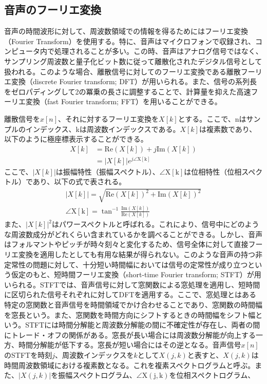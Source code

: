 \documentclass[12pt]{jarticle}
\numberwithin{equation}{section}    %
\numberwithin{figure}{section}      %
\numberwithin{table}{section}      %
\begin{document}
\subsection{音声のフーリエ変換}
音声の時間波形に対して、周波数領域での情報を得るためにはフーリエ変換（Fourier Transform）を使用する。特に、音声はマイクロフォンで収録され、コンピュータ内で処理されることが多い。この時、音声はアナログ信号ではなく、サンプリング周波数と量子化ビット数に従って離散化されたデジタル信号として扱われる。このような場合、離散信号に対してのフーリエ変換である離散フーリエ変換（discrete Fourier transform; DFT）が用いられる。また、信号の系列長をゼロパディングして2の冪乗の長さに調整することで、計算量を抑えた高速フーリエ変換（fast Fourier transform; FFT）を用いることができる。

離散信号を$x[n]$、それに対するフーリエ変換を$X[k]$とする。ここで、nはサンプルのインデックス、kは周波数インデックスである。$X[k]$は複素数であり、以下のように極座標表示することができる。
\begin{align}
    X[k] & = \mathrm{Re}(X[k]) + j\mathrm{Im}(X[k]) \\
         & = |X[k]|e^{j\angle\mathrm{X[k]}}
\end{align}
ここで、$|X[k]|$は振幅特性（振幅スペクトル）、$\angle\mathrm{X[k]}$は位相特性（位相スペクトル）であり、以下の式で表される。
\begin{gather}
    |X[k]| = \sqrt{\mathrm{Re}(X[k])^{2} + \mathrm{Im}(X[k])^{2}} \\
    \angle\mathrm{X[k]} = \tan^{-1} \frac{\mathrm{Im}(X[k])}{\mathrm{Re}(X[k])}
\end{gather}
また、$|X[k]|^2$はパワースペクトルと呼ばれる。これにより、信号中にどのような周波数成分がどれくらい含まれているかを調べることができる。しかし、音声はフォルマントやピッチが時々刻々と変化するため、信号全体に対して直接フーリエ変換を適用したとしても有用な結果が得られない。このような音声の持つ非定常性の問題に対して、十分短い時間幅においては信号の定常性が成り立つという仮定のもと、短時間フーリエ変換（short-time Fourier transform; STFT）が用いられる。STFTでは、音声信号に対して窓関数による窓処理を適用し、短時間に区切られた信号それぞれに対してDFTを適用する。ここで、窓処理とはある特定の窓関数と音声信号を時間領域でかけ合わせることであり、窓関数の時間幅を窓長という。また、窓関数を時間方向にシフトするときの時間幅をシフト幅という。STFTには時間分解能と周波数分解能の間に不確定性が存在し、両者の間にトレード・オフの関係がある。窓長が長い場合には周波数分解能が向上する一方、時間分解能が低下する。窓長が短い場合にはその逆となる。音声信号$x[n]$のSTFTを時刻$j$、周波数インデックスを$k$として$X(j, k)$と表すと、$X(j, k)$は時間周波数領域における複素数となる。これを複素スペクトログラムと呼ぶ。また、$|X(j, k)|$を振幅スペクトログラム、$\angle\mathrm{X(j, k)}$を位相スペクトログラム、
\end{document}
